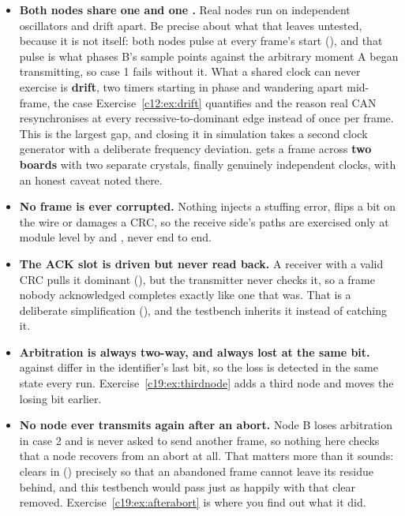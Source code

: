 \begin{itemize}
  \item \textbf{Both nodes share one  and one .} Real nodes run on
    independent oscillators and drift apart. Be precise about what that leaves untested, because it is
    not  itself: both nodes pulse  at every frame's start (),
    and that pulse is what phases B's sample points against the arbitrary moment A began transmitting,
    so case 1 fails without it. What a shared clock can never exercise is \textbf{drift}, two timers
    starting in phase and wandering apart mid-frame, the case
    Exercise~\ref{c12:ex:drift} quantifies and the reason real CAN resynchronises at every
    recessive-to-dominant edge instead of once per frame. This is the largest gap, and closing it in
    simulation takes a second clock generator with a deliberate frequency deviation.
     gets a frame across \textbf{two boards} with two separate crystals,
    finally genuinely independent clocks, with an honest caveat noted there.
  \item \textbf{No frame is ever corrupted.} Nothing injects a stuffing error, flips a bit on the wire
    or damages a CRC, so the receive side's  paths are exercised only at module level by
     and , never end to end.
  \item \textbf{The ACK slot is driven but never read back.} A receiver with a valid CRC pulls it
    dominant (), but the transmitter never checks it, so a frame nobody acknowledged
    completes exactly like one that was. That is a deliberate simplification
    (), and the testbench inherits it instead of catching it.
  \item \textbf{Arbitration is always two-way, and always lost at the same bit.}  against
     differ in the identifier's last bit, so the loss is detected in the same state every
    run. Exercise~\ref{c19:ex:thirdnode} adds a third node and moves the losing bit earlier.
  \item \textbf{No node ever transmits again after an abort.} Node B loses arbitration in case 2 and
    is never asked to send another frame, so nothing here checks that a node recovers from an abort at
    all. That matters more than it sounds:  clears  in
     () precisely so that an abandoned frame cannot leave its residue
    behind, and this testbench would pass just as happily with that clear removed.
    Exercise~\ref{c19:ex:afterabort} is where you find out what it did.
\end{itemize}
